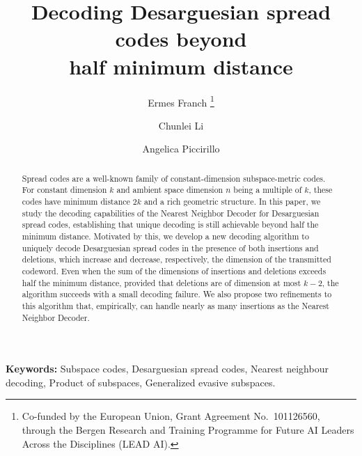 \documentclass{article}
\title{Decoding Desarguesian spread codes beyond \\half minimum distance}
\author[1]{Ermes Franch%
  \thanks{Co-funded by the European Union, Grant Agreement No.~101126560, through the Bergen Research and Training Programme for Future AI Leaders Across the Disciplines (LEAD AI).}}
\author[1]{Chunlei Li}
\author[2]{Angelica Piccirillo}
\affil[1]{University of Bergen, Bergen, Norway}
\affil[2]{Technical University of Munich, Munich, Germany}
\date{}
\begin{document}
\maketitle
\begin{abstract}
Spread codes are a well-known family of constant-dimension subspace-metric codes.
For constant dimension $k$ and ambient space dimension $n$ being a multiple of $k$, these codes have minimum distance $2k$ and a rich geometric structure.
In this paper, we study the decoding capabilities of the Nearest Neighbor Decoder for Desarguesian spread codes, establishing that unique decoding is still achievable beyond half the minimum distance. Motivated by this, we develop a new decoding algorithm to uniquely decode Desarguesian spread codes in the presence of both insertions and deletions, which increase and decrease, respectively, the dimension of the
transmitted codeword. Even when the sum of the dimensions of insertions and deletions exceeds half the minimum distance, provided that deletions are of dimension at most $k-2$, the algorithm succeeds with a small decoding failure. We also propose two refinements to this algorithm that, empirically, can handle nearly as many insertions as the Nearest Neighbor Decoder.
\end{abstract}
\textbf{Keywords: }Subspace codes, Desarguesian spread codes, Nearest neighbour decoding, Product of subspaces, Generalized evasive subspaces. 
\end{document}

